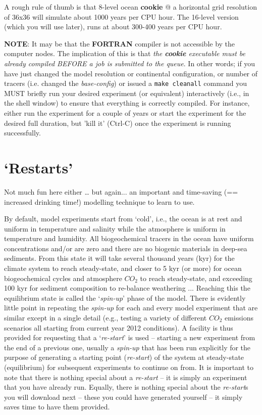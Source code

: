 A rough rule of thumb is that 8-level ocean \textbf{cookie} @ a horizontal grid resolution of 36x36 will simulate about 1000 years per CPU hour. The 16-level version (which you will use later), runs at about 300-400 years per CPU hour.

\vspace{1mm}
\noindent \textbf{NOTE}: It may be that the \textbf{FORTRAN} compiler is not accessible by the computer nodes. The implication of this is that \textit{the \textbf{cookie} executable must be already compiled BEFORE a job is submitted to the queue}. In other words; if you have just changed the model resolution or continental configuration, or number of tracers (i.e. changed the \textit{base-config}) or issued a \texttt{make cleanall} command you MUST briefly run your desired experiment (or equivalent) interactively (i.e., in the shell window) to ensure that everything is correctly compiled. For instance, either run the experiment for a couple of years or start the experiment for the desired full duration, but 'kill it' (\textsf{\small Ctrl-C}) once the experiment is running successfully.

\newpage

\section{‘Restarts’}

Not much fun here either … but again... an important and time-saving (== increased drinking time!) modelling technique to learn to use.

By default, model experiments start from ‘cold’, i.e., the ocean is at rest and uniform in temperature and salinity while the atmosphere is uniform in temperature and humidity. All biogeochemical tracers in the ocean have uniform concentrations and/or are zero and there are no biogenic materials in deep-sea sediments. From this state it will take several thousand years (kyr) for the climate system to reach steady-state, and closer to 5 kyr (or more) for ocean biogeochemical cycles and atmosphere \(CO_{2}\) to reach steady-state, and exceeding 100 kyr for sediment composition to re-balance weathering ... Reaching this the equilibrium state is called the ‘\textit{spin-up}’ phase of the model.
There is evidently little point in repeating the \textit{spin-up} for each and every model experiment that are similar except in a single detail (e.g., testing a variety of different \(CO_{2}\) emissions scenarios all starting from current year 2012 conditions). A facility is thus provided for requesting that a ‘\textit{re-start}’ is used – starting a new experiment from the end of a previous one, usually a \textit{spin-up} that has been run explicitly for the purpose of generating a starting point (\textit{re-start}) of the system at steady-state (equilibrium) for subsequent experiments to continue on from.
It is important to note that there is nothing special about a \textit{re-start} – it is simply an experiment that you have already run. Equally, there is nothing special about the \textit{re-start}s you will download next – these you could have generated yourself – it simply saves time to have them provided.

